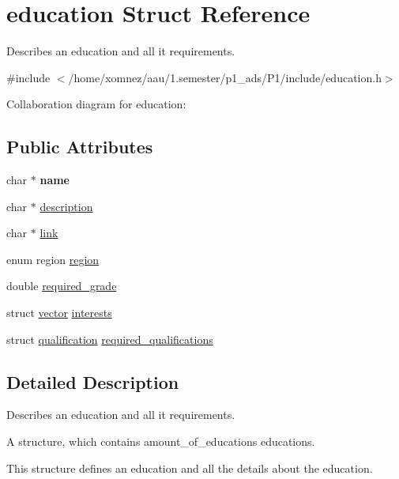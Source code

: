 \hypertarget{structeducation}{}\section{education Struct Reference}
\label{structeducation}


Describes an education and all it requirements.  




{\ttfamily \#include $<$/home/xomnez/aau/1.\+semester/p1\+\_\+ads/\+P1/include/education.\+h$>$}



Collaboration diagram for education\+:
\subsection*{Public Attributes}
\begin{DoxyCompactItemize}
\item 
\mbox{\label{structeducation_a67016708488af9826f66da80b2702e09}} 
char $\ast$ {\bfseries name}
\item 
char $\ast$ \hyperlink{structeducation_a24cdb1b8c614b0104b55dbfb57a12979}{description}
\item 
char $\ast$ \hyperlink{structeducation_a0244d20a4b1f00a6088cece10b77a0f3}{link}
\item 
enum region \hyperlink{structeducation_afbd04b27ec3401b2076f1a2806a4bd42}{region}
\item 
double \hyperlink{structeducation_ab0bb73fcbd8c30cb1be9f01f7fa608cd}{required\+\_\+grade}
\item 
struct \hyperlink{structvector}{vector} \hyperlink{structeducation_ae8ea10524118581a9ed1a93bafc5cc54}{interests}
\item 
struct \hyperlink{structqualification}{qualification} \hyperlink{structeducation_a0e95ac75d550a79ae7e10e915adb59ac}{required\+\_\+qualifications}
\end{DoxyCompactItemize}


\subsection{Detailed Description}
Describes an education and all it requirements. 

A structure, which contains amount\+\_\+of\+\_\+educations educations.

This structure defines an education and all the details about the education. 

